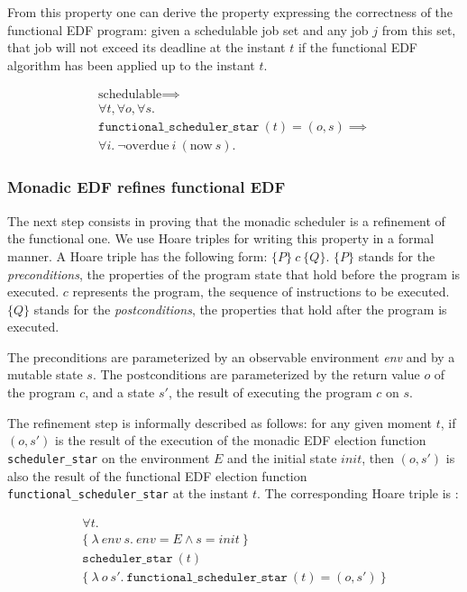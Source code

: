 From this property one can derive the property expressing the correctness of the functional EDF program:
given a schedulable job set and any job $j$ from this set, that job will not exceed its deadline at the instant $t$ if the functional EDF algorithm has been applied up to the instant $t$.

	\begin{gather*}
		\text{schedulable} \implies\\
		\forall t, \forall o, \forall s.\\
		\texttt{functional\_scheduler\_star}~(t) = (o,s) \implies\\
		\forall i.~\neg \text{overdue}~i~(\text{now}~s).
	\end{gather*}

	\subsubsection{Monadic EDF refines functional EDF}
	\label{sec:monadic}
	The next step consists in proving that the monadic scheduler is a refinement of the functional one. We  use Hoare triples \cite{hoare1969axiomatic} for writing this property in a formal manner.
	A Hoare triple has the following form: $\{ P \}~c~\{ Q \}$. $\{ P \}$ stands for the \emph{preconditions}, the properties of the program state that hold before the program is executed. $c$ represents the program, the sequence of instructions to be executed. $\{Q \}$ stands for the \emph{postconditions}, the properties that hold after the program is executed.

	The preconditions are parameterized by an observable environment \emph{env} and by a mutable state $s$. The postconditions are parameterized by the return value $o$ of the program $c$, and a state $s'$, the result of executing the program $c$ on $s$.

	The refinement step is informally described as follows: for any given moment $t$, if $(o, s')$ is the result of the execution of the monadic EDF election function \texttt{scheduler\_star} on the environment $E$ and the initial state $init$, then $(o, s')$ is also the result of the functional EDF election function \texttt{functional\_scheduler\_star} at the instant $t$. The corresponding Hoare triple is :

	\begin{gather*}
		\forall t.\\
		\{
		~\lambda~\textit{env}~s. ~\textit{env} = E \land s = \textit{init}~
		\}\\
		\texttt{scheduler\_star}~(t)\\
		\{
		~\lambda~o~s'. ~\texttt{functional\_scheduler\_star}~(t) = (o,s')~
		\}
	\end{gather*}

